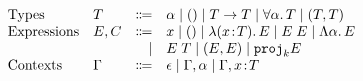 \[
\begin{array}{llrl}
  \text{Types}       & T    & \Coloneqq & \alpha \mid () \mid T \to T \mid \forall \alpha. \, T \mid (T, T) \\ 
  \text{Expressions} & E, C & \Coloneqq & x \mid () \mid \lambda (x \!:\! T).\, E \mid E \; E \mid \Lambda \alpha.\, E \\ 
                     &      & \mid      & E \; T \mid (E, E) \mid {\texttt{proj}}_{k} E \\
  \text{Contexts} & \Gamma & \Coloneqq & \epsilon \mid \Gamma, \alpha \mid \Gamma, x \!:\! T \\
\end{array}
\]
